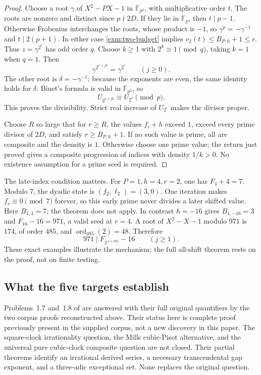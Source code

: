 \documentclass[11pt,a4paper]{article}
\numberwithin{equation}{section}
\theoremstyle{definition}
\theoremstyle{remark}
\begin{document}
\begin{proof}
Choose a root \(\gamma\) of \(X^2-PX-1\) in
\(\mathbb F_{p^2}\), with multiplicative order \(t\).
The roots are nonzero and distinct since \(p\nmid2D\).
If they lie in \(\mathbb F_p\), then \(t\mid p-1\).
Otherwise Frobenius interchanges the roots, whose product
is \(-1\), so \(\gamma^p=-\gamma^{-1}\) and
\(t\mid2(p+1)\). In either case \eqref{exm:two-budget}
implies \(v_2(t)\le B_{P,h}+1\le r\).
Thus \(z=\gamma^{2^r}\) has odd order \(q\).
Choose \(k\ge1\) with \(2^k\equiv1\pmod q\), taking
\(k=1\) when \(q=1\). Then
\[
 \gamma^{2^{r+jk}}=\gamma^{2^r}\qquad(j\ge0).
\]
The other root is \(\delta=-\gamma^{-1}\); because the
exponents are even, the same identity holds for \(\delta\).
Binet's formula is valid in \(\mathbb F_{p^2}\), so
\[
 U_{2^{r+jk}}\equiv U_{2^r}\pmod p.
\]
This proves the divisibility. Strict real increase of
\(U_{2^r}\) makes the divisor proper.

Choose \(R\) so large that for \(r\ge R\), the values
\(f_r+h\) exceed \(1\), exceed every prime divisor of
\(2D\), and satisfy \(r\ge B_{P,h}+1\).
If no such value is prime, all are composite and the
density is \(1\). Otherwise choose one prime value;
the return just proved gives a composite progression
of indices with density \(1/k>0\). No existence
assumption for a prime seed is required.
\end{proof}

The late-index condition matters. For \(P=1,h=4,r=2\),
one has \(F_4+4=7\). Modulo \(7\), the dyadic state is
\((f_2,\ell_2)=(3,0)\). One iteration makes
\(f_r\equiv0\pmod7\) forever, so this early prime never
divides a later shifted value. Here \(B_{1,4}=7\);
the theorem does not apply. In contrast \(h=-16\)
gives \(B_{1,-16}=3\) and \(F_{16}-16=971\), a valid
seed at \(r=4\). A root of \(X^2-X-1\) modulo \(971\)
is \(174\), of order \(485\), and
\(\operatorname{ord}_{485}(2)=48\). Therefore
\[
 971\mid F_{2^{\,4+48j}}-16\qquad(j\ge1).
\]
These exact examples illustrate the mechanism; the full
all-shift theorem rests on the proof, not on finite testing.

\subsection{What the five targets establish}\label{exm:status}

Problems~1.7 and~1.8 of \cite{SaitoIntervals} are answered
with their full original quantifiers by the two corpus proofs
reconstructed above. Their status here is complete proof
previously present in the supplied corpus, not a new
discovery in this paper. The square-clock irrationality
question, the Mills cubic-Pisot alternative, and the universal
pure cubic-clock composite question are not closed.
Their partial theorems identify an irrational derived series,
a necessary transcendental gap exponent, and a three-adic
exceptional set. None replaces the original question.
\end{document}
